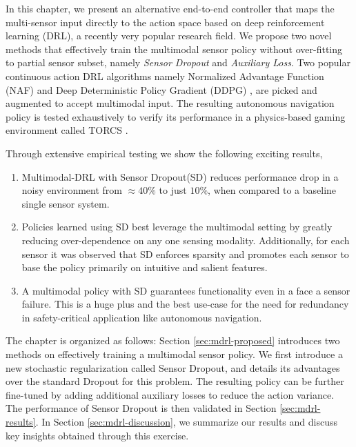 \documentclass[../thesis.tex]{subfiles}
\begin{document}
In this chapter, we present an alternative end-to-end controller that maps the multi-sensor input directly to the action space based on deep reinforcement learning (DRL), a recently very popular research field. 
We propose two novel methods that effectively train the multimodal sensor policy without over-fitting to partial sensor subset, namely \textit{Sensor Dropout} and \textit{Auxiliary Loss}. 
Two popular continuous action DRL algorithms namely Normalized Advantage Function (NAF) \cite{CDQN} and Deep Deterministic Policy Gradient (DDPG) \cite{DBLP:journals/corr/LillicrapHPHETS15}, are picked and augmented to accept multimodal input. The resulting autonomous navigation policy is tested exhaustively to verify its performance in a physics-based gaming environment called TORCS \cite{wymann2000torcs}. 

Through extensive empirical testing we show the following exciting results,
\begin{enumerate}

	\item Multimodal-DRL with Sensor Dropout(SD) reduces performance drop in a noisy environment from $\approx 40\%$ to just $10\%$, when compared to a baseline single sensor system.
	
	\item Policies learned using SD best leverage the multimodal setting by greatly reducing over-dependence on any one sensing modality. Additionally, for each sensor it was observed that SD enforces sparsity and promotes each sensor to base the policy primarily on intuitive and salient features.
	
	\item A multimodal policy with SD guarantees functionality even in a face a sensor failure. This is a huge plus and the best use-case for the need for redundancy in safety-critical application like autonomous navigation.

\end{enumerate}


The chapter is organized as follows: 
Section \ref{sec:mdrl-proposed} introduces two methods on effectively training a multimodal sensor policy. We first introduce a new stochastic regularization called Sensor Dropout, and details its advantages over the standard Dropout for this problem. The resulting policy can be further fine-tuned by adding additional auxiliary losses to reduce the action variance. The performance of Sensor Dropout is then validated in Section \ref{sec:mdrl-results}. In Section \ref{sec:mdrl-discussion}, we summarize our results and discuss key insights obtained through this exercise. 
\end{document}

